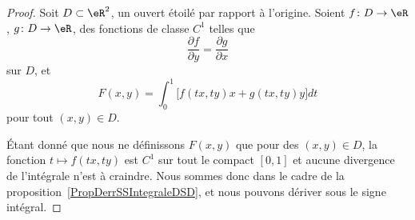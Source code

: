 \begin{proof}
	Soit \( D\subset\eR^2\), un ouvert étoilé par rapport à l'origine. Soient \( f\colon D\to \eR\), \( g\colon D\to \eR\), des fonctions de classe \( C^1\) telles que
	\begin{equation}
		\frac{ \partial f }{ \partial y }=\frac{ \partial g }{ \partial x }
	\end{equation}
	sur \( D\), et
	\begin{equation}		\label{EqIMDefFformI33}
		F(x,y)=\int_0^1\big[  f(tx,ty)x+g(tx,ty)y  \big]dt
	\end{equation}
	pour tout \( (x,y)\in D\).

	Étant donné que nous ne définissons \( F(x,y)\) que pour des \( (x,y)\in D\), la fonction \( t\mapsto f(tx,ty)\) est \( C^1\) sur tout le compact \( [0,1]\) et aucune divergence de l'intégrale n'est à craindre. Nous sommes donc dans le cadre de la proposition~\ref{PropDerrSSIntegraleDSD}, et nous pouvons dériver sous le signe intégral.


\end{proof}
